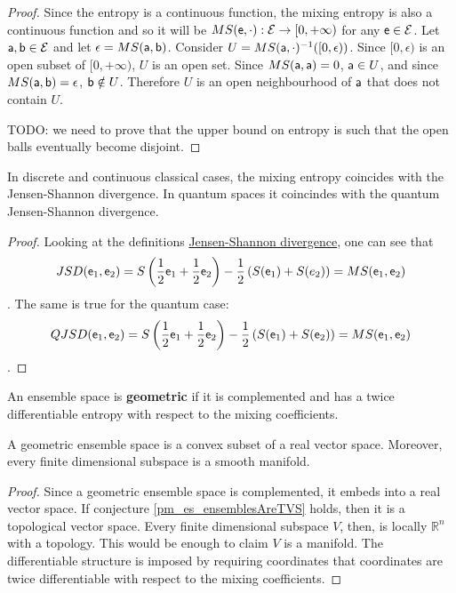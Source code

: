 \begin{proof}
	Since the entropy is a continuous function, the mixing entropy is also a continuous function and so it will be $MS(\ens, \cdot) : \Ens \to [0,+\infty)$ for any $\ens \in \Ens$. Let $\ens[a], \ens[b] \in \Ens$ and let $\epsilon = MS(\ens[a], \ens[b])$. Consider $U = MS(\ens[a], \cdot)^{-1}([0,\epsilon))$. Since $[0,\epsilon)$ is an open subset of $[0,+\infty)$, $U$ is an open set. Since $MS(\ens[a], \ens[a]) = 0$, $\ens[a] \in U$, and since $MS(\ens[a], \ens[b]) = \epsilon$, $\ens[b] \notin U$. Therefore $U$ is an open neighbourhood of $\ens[a]$ that does not contain $U$.
	
	TODO: we need to prove that the upper bound on entropy is such that the open balls eventually become disjoint.
\end{proof}

\begin{prop}
	In discrete and continuous classical cases, the mixing entropy coincides with the Jensen-Shannon divergence. In quantum spaces it coincindes with the quantum Jensen-Shannon divergence.
\end{prop}

\begin{proof}
	Looking at the definitions \href{https://en.wikipedia.org/wiki/Jensen%E2%80%93Shannon_divergence}{Jensen-Shannon divergence}, one can see that
	$$ JSD(\ens_1, \ens_2) = S\left(\frac{1}{2}\ens_1 + \frac{1}{2}\ens_2 \right)  - \frac{1}{2} \left(S(\ens_1) + S(e_2)\right) = MS(\ens_1, \ens_2)$$.
	The same is true for the quantum case:
	$$ QJSD(\ens_1, \ens_2) = S\left(\frac{1}{2}\ens_1 + \frac{1}{2}\ens_2 \right)  - \frac{1}{2} \left(S(\ens_1) + S(\ens_2)\right) = MS(\ens_1, \ens_2)$$.
\end{proof}

\begin{defn}
	An ensemble space is \textbf{geometric} if it is complemented and has a twice differentiable entropy with respect to the mixing coefficients.
\end{defn}

\begin{conj}
	A geometric ensemble space is a convex subset of a real vector space. Moreover, every finite dimensional subspace is a smooth manifold.
\end{conj}

\begin{proof}
	Since a geometric ensemble space is complemented, it embeds into a real vector space. If conjecture \ref{pm_es_ensemblesAreTVS} holds, then it is a topological vector space. Every finite dimensional subspace $V$, then, is locally $\mathbb{R}^n$ with a topology. This would be enough to claim $V$ is a manifold. The differentiable structure is imposed by requiring coordinates that coordinates are twice differentiable with respect to the mixing coefficients.
\end{proof}

